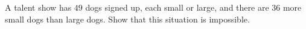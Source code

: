 A talent show has $49$ dogs signed up, each small or large, and there are $36$ more small dogs than large dogs. Show that this situation is impossible.
